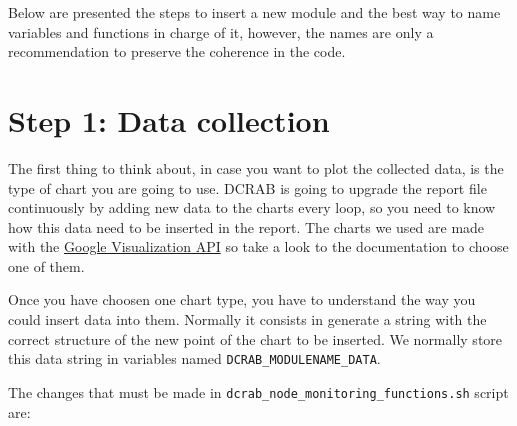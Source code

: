 \documentclass[10pt,a4paper]{report}
\begin{document}
Below are presented the steps to insert a new module and the best way to name variables and functions in charge of it, however, the names are only a recommendation to preserve the coherence in the code.

\section{Step 1: Data collection}

The first thing to think about, in case you want to plot the collected data, is the type of chart you are going to use. DCRAB is going to upgrade the report file continuously by adding new data to the charts every loop, so you need to know how this data need to be inserted in the report. The charts we used are made with the \href{https://developers.google.com/chart/interactive/docs/reference}{Google Visualization API} so take a look to the documentation to choose one of them.

Once you have choosen one chart type, you have to understand the way you could insert data into them. Normally it consists in generate a string with the correct structure of the new point of the chart to be inserted. We normally store this data string in variables named \verb+DCRAB_MODULENAME_DATA+.

The changes that must be made in \texttt{dcrab\_node\_monitoring\_functions.sh} script are:
\end{document}
